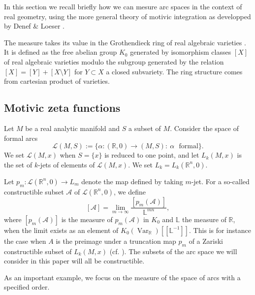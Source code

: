\documentclass[12pt,a4paper,leqno]{amsart}
\theoremstyle{definition}
\begin{document}
In this section we recall briefly how we can mesure arc spaces in the
context of real geometry, using
the more general theory of motivic integration as developped by Denef
\& Loeser \cite{DL}.

The measure takes its value in the Grothendieck ring of real algebraic
varieties \cite{MCP}. It is defined as the free abelian group $K_0$ generated by isomorphism
classes $[X]$ of real algebraic varieties modulo the subgroup generated by the
relation $[X]=[Y]+[X\setminus Y]$ for $Y\subset X$ a closed
subvariety. The ring structure comes from cartesian product of varieties.

\subsection{Motivic zeta functions}\label{arc-space}

Let $M$ be a real analytic manifold and $S$ a subset of $M$.
Consider the space of formal arcs
$$
\mathcal L(M,S):=\{
\alpha:({\mathbb{R}},0)\to (M,S):\
\alpha \textrm{~~formal}\}.
$$
We set $\mathcal L(M,x)$ when $S=\{x\}$ is reduced to one point, and let $L_k(M,x)$ is the set of $k$-jets of elements of $\mathcal L(M,x)$.
We set $L_k=L_k({\mathbb{R}}^n,0)$. 

Let $p_m:\mathcal{L}({\mathbb{R}}^n,0)\to L_m$ denote the map defined by 
taking $m$-jet. 
For a so-called constructible subset $\mathcal A$ of $\mathcal L({\mathbb{R}}^n,0)$, we define 
$$
[\mathcal A]=\lim_{m\to\infty}\frac{[p_m(\mathcal A)]}{{\mathbb{L}}^{mn}},
$$
where $[p_m(\mathcal A)]$ is the measure of $p_m(\mathcal A)$ in $K_0$
and ${\mathbb{L}}$ the measure of ${\mathbb{R}}$,
when the limit exists as an element of
$K_0({\mathop{\mathrm{Var}}\nolimits}_{\mathbb{R}})[[{\mathbb{L}}^{-1}]]$. This is for instance the case when $A$ is
the preimage under a truncation map $p_m$ of a Zariski constructible
subset of $L_k(M,x)$ (cf. \cite{DL}).
The subsets of the arc space we will
consider in this paper will all be constructible.

As an important example, we focus on the measure of the space of arcs
with a specified order.
\end{document}
